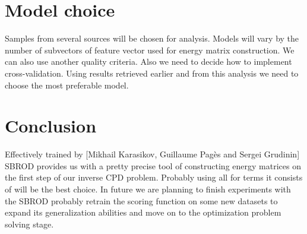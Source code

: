 \documentclass[12pt,twoside]{article}
\begin{document}
\section{Model choice}

Samples from several sources will be chosen for analysis. Models will vary by the number of subvectors of feature vector used for energy matrix construction. We can also use another quality criteria. Also we need to decide how to implement cross-validation.
Using results retrieved earlier and from this analysis we need to choose the most preferable model. 
\section{Conclusion}
Effectively trained by [Mikhail Karasikov, Guillaume Pagès and Sergei Grudinin] SBROD provides us with a pretty precise tool of constructing energy matrices on the first step of our inverse CPD problem. Probably using all for terms it consists of will be the best choice.
In future we are planning to finish experiments with the SBROD probably retrain the scoring function on some new datasets to expand its generalization abilities and move on to the optimization problem solving stage.



\end{document}
